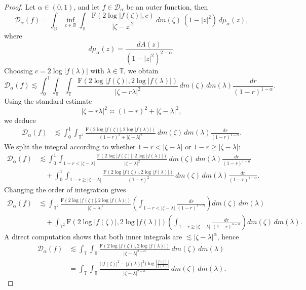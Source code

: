 \documentclass[12pt,reqno,a4paper]{amsart}
\newcommand{\FF}{\mathrm{F}}
\newcommand{\cD}{{\mathcal{D}}}
\numberwithin{equation}{section}
\begin{document}
	\begin{proof}
		Let $\alpha \in (0,1)$, and let $f \in \cD_\alpha$ be an outer function, then
		\[
		\cD_\alpha(f)
		=
		\int_{\mathbb D}
		\inf_{c\in\mathbb R}
		\int_{\mathbb T}
		\frac{\FF(2\log|f(\zeta)|,c)}
		{|\zeta-z|^2}
		\,dm(\zeta)\,
		(1-|z|^2)\,d\mu_\alpha(z),
		\]
		where
		\[
		d\mu_\alpha(z)=\frac{dA(z)}{(1-|z|^2)^{2-\alpha}}.
		\]
		Choosing $c=2\log|f(\lambda)|$ with $\lambda\in\mathbb T$, we obtain
		\[
		\cD_\alpha(f)
		\lesssim
		\int_0^1
		\int_{\mathbb T}
		\int_{\mathbb T}
		\frac{\FF(2\log|f(\zeta)|,2\log|f(\lambda)|)}
		{|\zeta-r\lambda|^2}
		\,dm(\zeta)\,dm(\lambda)
		\frac{dr}{(1-r)^{1-\alpha}}.
		\]
		Using the standard estimate
		\[
		|\zeta-r\lambda|^2 \asymp (1-r)^2+|\zeta-\lambda|^2,
		\]
		we deduce
		\[
		\begin{aligned}
			\cD_\alpha(f)
			&\lesssim
			\int_0^1
			\int_{\mathbb T^2}
			\frac{\FF(2\log|f(\zeta)|,2\log|f(\lambda)|)}
			{(1-r)^2+|\zeta-\lambda|^2}
			\,dm(\zeta)\,dm(\lambda)
			\frac{dr}{(1-r)^{1-\alpha}}.
		\end{aligned}
		\]
		We split the integral according to whether
		$1-r<|\zeta-\lambda|$ or $1-r\ge|\zeta-\lambda|$:
		\[
		\begin{aligned}
			\cD_\alpha(f)
			&\lesssim
			\int_0^1
			\int_{1-r<|\zeta-\lambda|}
			\frac{\FF(2\log|f(\zeta)|,2\log|f(\lambda)|)}
			{|\zeta-\lambda|^2}
			\,dm(\zeta)\,dm(\lambda)
			\frac{dr}{(1-r)^{1-\alpha}}
			\\
			&\quad
			+
			\int_0^1
			\int_{1-r\ge|\zeta-\lambda|}
			\frac{\FF(2\log|f(\zeta)|,2\log|f(\lambda)|)}
			{(1-r)^2}
			\,dm(\zeta)\,dm(\lambda)
			\frac{dr}{(1-r)^{1-\alpha}}.
		\end{aligned}
		\]
		Changing the order of integration gives
		\[
		\begin{aligned}
			\cD_\alpha(f)
			&\lesssim
			\int_{\mathbb T^2}
			\frac{\FF(2\log|f(\zeta)|,2\log|f(\lambda)|)}
			{|\zeta-\lambda|^2}
			\left(
			\int_{1-r<|\zeta-\lambda|}
			\frac{dr}{(1-r)^{1-\alpha}}
			\right)
			dm(\zeta)\,dm(\lambda)
			\\
			&\quad
			+
			\int_{\mathbb T^2}
			\FF(2\log|f(\zeta)|,2\log|f(\lambda)|)
			\left(
			\int_{1-r\ge|\zeta-\lambda|}
			\frac{dr}{(1-r)^{3-\alpha}}
			\right)
			dm(\zeta)\,dm(\lambda).
		\end{aligned}
		\]
		A direct computation shows that both inner integrals are
		$\lesssim |\zeta-\lambda|^\alpha$, hence
		\[\begin{aligned}
			\cD_\alpha(f)&
			\lesssim
			\int_{\mathbb T}
			\int_{\mathbb T}
			\frac{\FF(2\log|f(\zeta)|,2\log|f(\lambda)|)}
			{|\zeta-\lambda|^{2-\alpha}}
			\,dm(\zeta)\,dm(\lambda)\\&=
			\int_{\mathbb T}
			\int_{\mathbb T}
			\frac{\bigl(|f(\zeta)|^2-|f(\lambda)|^2\bigr)
				\log\left|\frac{f(\zeta)}{f(\lambda)}\right|}
			{|\zeta-\lambda|^{2-\alpha}}
			\,dm(\zeta)\,dm(\lambda).
		\end{aligned}
		\]
	\end{proof}
\end{document}
